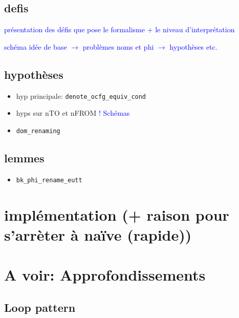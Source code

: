 \documentclass[11pt]{article}
\newcommand{\leon}[1]{\textcolor{blue}{#1}}
\begin{document}
\subsection{defis}

\leon{présentation des défis que pose le formalisme + le niveau d'interprétation}

\leon{schéma idée de base $\rightarrow$ problèmes noms et phi $\rightarrow$ hypothèses etc.}

\subsection{hypothèses}

\begin{itemize}
  \item hyp principale: \texttt{denote\_ocfg\_equiv\_cond}
  \item hyps sur nTO et nFROM \leon{! Schémas}
  \item \texttt{dom\_renaming}
\end{itemize}

\subsection{lemmes}

\begin{itemize}
  \item \texttt{bk\_phi\_rename\_eutt}
\end{itemize}

\section{implémentation (+ raison pour s'arrèter à naïve (rapide))}
\label{sec:impl}

\section{A voir: Approfondissements}
\label{sec:appr}

\subsection{Loop pattern}

\end{document}
